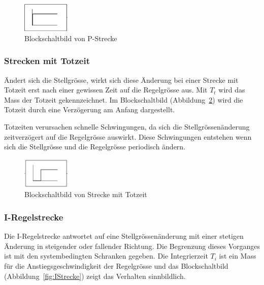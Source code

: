 \begin{figure}[h!, width=\pagewidth]
    \centering
    \includegraphics[width=0.2\textwidth]{images/PStrecke}
    \caption{Blockschaltbild von P-Strecke}
    \label{fig:PStrecke}
\end{figure}


\subsubsection*{Strecken mit Totzeit}
\"Andert  sich  die  Stellgr\"osse,  wirkt sich  diese  \"Anderung  bei  einer
Strecke  mit Totzeit  erst  nach  einer gewissen  Zeit  auf die  Regelgr\"osse
aus. Mit $T_t$  wird das  Mass der Totzeit  gekennzeichnet. Im Blockschaltbild
(Abbildung~\ref{fig:TotZeit})  wird die  Totzeit durch  eine Verz\"ogerung  am
Anfang dargestellt.

Totzeiten     verursachen    schnelle     Schwingungen,     da    sich     die
Stellgr\"ossen\"anderung zeitverz\"ogert auf die Regelgr\"osse auswirkt. Diese
Schwingungen  entstehen  wenn sich  die  Stellgr\"osse  und die  Regelgr\"osse
periodisch \"andern.

\begin{figure}[h!, width=\pagewidth]
    \centering
    \includegraphics[width=0.2\textwidth]{images/Totzeit}
    \caption{Blockschaltbild von Strecke mit Totzeit}
    \label{fig:TotZeit}
\end{figure}


\subsubsection*{I-Regelstrecke}

Die  I-Regelstrecke  antwortet  auf eine  Stellgr\"ossen\"anderung  mit  einer
stetigen  \"Anderung in  steigender  oder  fallender Richtung. Die  Begrenzung
dieses   Vorganges  ist   mit  den   systembedingten  Schranken   gegeben. Die
Integrierzeit  $T_i$  ist  ein  Mass  f\"ur  die  Anstiegsgeschwindigkeit  der
Regelgr\"osse und das Blockschaltbild (Abbildung~\ref{fig:IStrecke}) zeigt das
Verhalten sinnbildlich.

